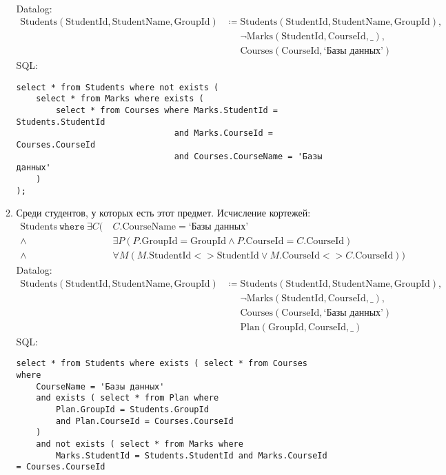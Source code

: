 \documentclass{article}
\newcommand{\Students}{\mathrm{Students}}
\newcommand{\StudentId}{\mathrm{StudentId}}
\newcommand{\StudentName}{\mathrm{StudentName}}
\newcommand{\GroupId}{\mathrm{GroupId}}
\newcommand{\Courses}{\mathrm{Courses}}
\newcommand{\CourseId}{\mathrm{CourseId}}
\newcommand{\CourseName}{\mathrm{CourseName}}
\newcommand{\Plan}{\mathrm{Plan}}
\newcommand{\Marks}{\mathrm{Marks}}
\newcommand{\where}{~\mathtt{where}~}
\newcommand{\poloneq}{\mathrel{\phantom{\coloneq}}}
\begin{document}
\begin{enumerate}
\begin{enumerate}
\begin{align*}
        \end{align*}
        Datalog:
        \begin{align*}
            \Students(\StudentId, \StudentName, \GroupId)
            &\coloneq \Students(\StudentId, \StudentName, \GroupId), \\
            &\poloneq \neg \Marks(\StudentId, \CourseId, \_), \\
            &\poloneq \Courses(\CourseId, \text{`Базы данных'})
        \end{align*}
        SQL:
        \begin{verbatim}
select * from Students where not exists (
    select * from Marks where exists (
        select * from Courses where Marks.StudentId = Students.StudentId
                                and Marks.CourseId = Courses.CourseId
                                and Courses.CourseName = 'Базы данных'
    )
);
        \end{verbatim}
        \item Среди студентов, у которых есть этот предмет.
        Исчисление кортежей:
        \begin{align*}
            \Students \where
            \exists C (&\ C.\CourseName = \text{`Базы данных'} \\
            \land&\  \exists P (P.\GroupId = \GroupId
                \land P.\CourseId = C.\CourseId) \\
            \land&\  \forall M
                (M.\StudentId <> \StudentId \lor M.\CourseId <> C.\CourseId)
            )
        \end{align*}
        Datalog:
        \begin{align*}
            \Students(\StudentId, \StudentName, \GroupId)
            &\coloneq \Students(\StudentId, \StudentName, \GroupId), \\
            &\poloneq \neg \Marks(\StudentId, \CourseId, \_), \\
            &\poloneq \Courses(\CourseId, \text{`Базы данных'}) \\
            &\poloneq \Plan(\GroupId, \CourseId, \_)
        \end{align*}
        SQL:
        \begin{verbatim}
select * from Students where exists ( select * from Courses where
    CourseName = 'Базы данных'
    and exists ( select * from Plan where
        Plan.GroupId = Students.GroupId
        and Plan.CourseId = Courses.CourseId
    )
    and not exists ( select * from Marks where
        Marks.StudentId = Students.StudentId and Marks.CourseId = Courses.CourseId

\end{verbatim}
\end{enumerate}
\end{enumerate}
\end{document}
